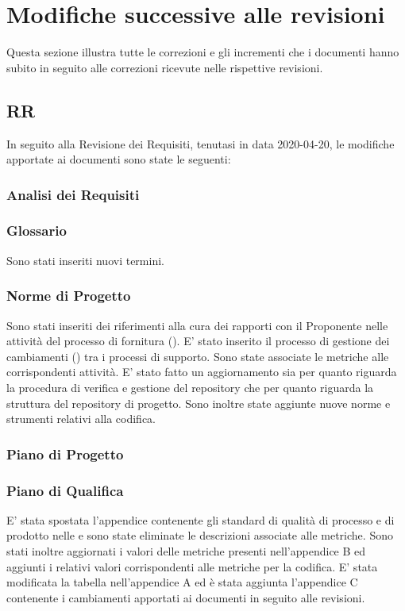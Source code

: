 \section{Modifiche successive alle revisioni}
Questa sezione illustra tutte le correzioni e gli incrementi che i documenti hanno subito in seguito alle correzioni ricevute nelle rispettive revisioni.

\subsection{RR}
In seguito alla Revisione dei Requisiti, tenutasi in data 2020-04-20, le modifiche apportate ai documenti sono state le seguenti:
	\subsubsection*{Analisi dei Requisiti}
	
	\subsubsection*{Glossario}
	Sono stati inseriti nuovi termini.
	
	\subsubsection*{Norme di Progetto}
	Sono stati inseriti dei riferimenti alla cura dei rapporti con il Proponente nelle attività del processo di fornitura (). E' stato inserito il processo di gestione dei cambiamenti () tra i processi di supporto. Sono state associate le metriche alle corrispondenti attività. 
	E' stato fatto un aggiornamento sia per quanto riguarda la procedura di verifica e gestione del repository che per quanto riguarda la struttura del repository di progetto. Sono inoltre state aggiunte nuove norme e strumenti relativi alla codifica.
	
	\subsubsection*{Piano di Progetto}
	
	\subsubsection*{Piano di Qualifica}
	E' stata spostata l’appendice contenente gli standard di qualità di processo e di prodotto nelle \NdP{} e sono state eliminate le descrizioni associate alle metriche. Sono stati inoltre aggiornati i valori delle metriche presenti nell’appendice B ed aggiunti i relativi valori corrispondenti alle metriche per la codifica. E' stata modificata la tabella nell’appendice A ed è stata aggiunta l'appendice C contenente i cambiamenti apportati ai documenti in seguito alle revisioni.